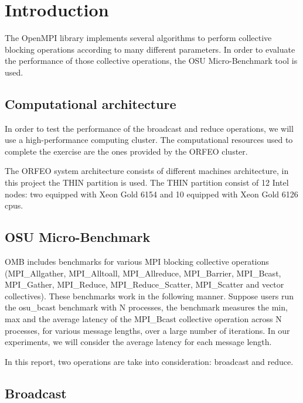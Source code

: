 \section{Introduction}

The OpenMPI library implements several algorithms to perform collective blocking operations according to many different parameters. In order to evaluate the performance of those collective operations, the OSU Micro-Benchmark tool is used. 

\subsection{Computational architecture}

In order to test the performance of the broadcast and reduce operations, we will use a high-performance computing cluster. The computational resources used to complete the exercise are the ones provided by the ORFEO cluster.

The ORFEO system architecture consists of different machines architecture, in this project the THIN partition is used. The THIN partition consist of 12 Intel nodes: two equipped with Xeon Gold 6154 and 10 equipped with Xeon Gold 6126 cpus.

\subsection{OSU Micro-Benchmark}

OMB includes benchmarks for various MPI blocking
collective operations (MPI\_Allgather, MPI\_Alltoall, MPI\_Allreduce, MPI\_Barrier, MPI\_Bcast, MPI\_Gather, MPI\_Reduce, MPI\_Reduce\_Scatter, MPI\_Scatter and vector collectives). These benchmarks work in the following manner. Suppose users run the osu\_bcast benchmark with N processes, the benchmark measures the min, max and the average latency of the MPI\_Bcast collective operation across N processes, for various message lengths, over a large number of iterations. In our experiments, we will consider the average latency for each message length.

In this report, two operations are take into consideration: broadcast and reduce.


\subsection{Broadcast}

